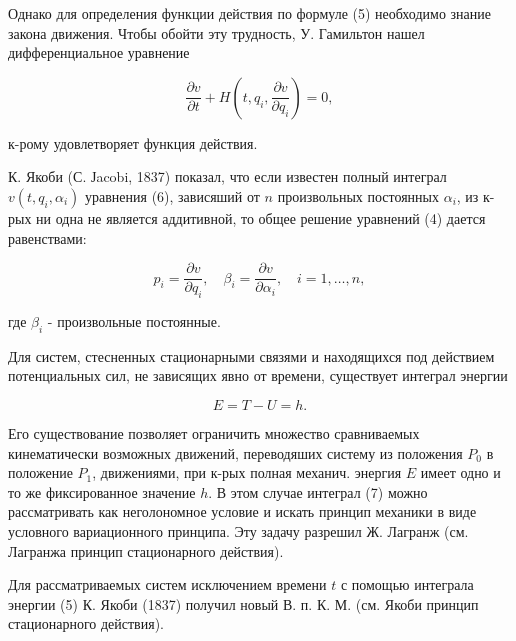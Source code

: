 \documentclass[10pt]{article}
\begin{document}
Однако для определения функции действия по формуле (5) необходимо знание закона движения. Чтобы обойти эту трудность, У. Гамильтон нашел дифференциальное уравнение



\[

\frac{\partial v}{\partial t}+H\left(t, q_{i}, \frac{\partial v}{\partial q_{i}}\right)=0,

\]



к-рому удовлетворяет функция действия.



К. Якоби (С. Јacobi, 1837) показал, что если известен полный интеграл $v\left(t, q_{i}, \alpha_{i}\right)$ уравнения (6), зависяший от $n$ произвольных постоянных $\alpha_{i}$, из к-рых ни одна не является аддитивной, то общее решение уравнений (4) дается равенствами:



\[

p_{i}=\frac{\partial v}{\partial q_{i}}, \quad \beta_{i}=\frac{\partial v}{\partial \alpha_{i}}, \quad i=1, \ldots, n,

\]



где $\beta_{i}$ - произвольные постоянные.



Для систем, стесненных стационарными связями и находящихся под действием потенциальных сил, не зависящих явно от времени, существует интеграл энергии



\[

E=T-U=h .

\]



Его существование позволяет ограничить множество сравниваемых кинематически возможных движений, переводяших систему из положения $P_{0}$ в положение $P_{1}$, движениями, при к-рых полная механич. энергия $E$ имеет одно и то же фиксированное значение $h$. В этом случае интеграл (7) можно рассматривать как неголономное условие и искать принцип механики в виде условного вариационного принципа. Эту задачу разрешил Ж. Лагранж (см. Лагранжа принцип стационарного действия).



Для рассматриваемых систем исключением времени $t$ с помощью интеграла энергии (5) К. Якоби (1837) получил новый В. п. К. М. (см. Якоби принцип стационарного действия).
\end{document}
